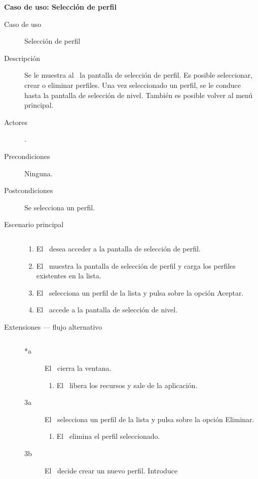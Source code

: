 \textbf{Caso de uso: Selección de perfil}

\begin{description}
    \item [Caso de uso] Selección de perfil
    \item [Descripción] Se le muestra al \jugador\ la pantalla de selección
    de perfil. Es posible seleccionar, crear o eliminar perfiles. Una vez
    seleccionado un perfil, se le conduce hasta la pantalla de selección
    de nivel. También es posible volver al menú principal.
    \item [Actores] \jugador.
    \item [Precondiciones] Ninguna.
    \item [Postcondiciones] Se selecciona un perfil.
    \item [Escenario principal] $\quad$
        \begin{enumerate}
            \item El \jugador\ desea acceder a la pantalla de selección 
            de perfil.
            \item El \sistema\ muestra la pantalla de selección de perfil
            y carga los perfiles existentes en la lista.
            \item El \jugador\ selecciona un perfil de la lista y pulsa sobre
            la opción Aceptar.
            \item El \sistema\ accede a la pantalla de selección de nivel.
        \end{enumerate}
    \item[Extensiones --- flujo alternativo] $\quad$
        \begin{description}
            \item [*a] El \jugador\ cierra la ventana.
                \begin{enumerate}
                    \item El \sistema\ libera los recursos y sale de la aplicación.
                \end{enumerate}
            \item [3a] El \jugador\ selecciona un perfil de la lista y pulsa
            sobre la opción Eliminar.
                \begin{enumerate}
                    \item El \sistema\ elimina el perfil seleccionado.
                \end{enumerate}
            \item [3b] El \jugador\ decide crear un nuevo perfil. Introduce

\end{description}
\end{description}
